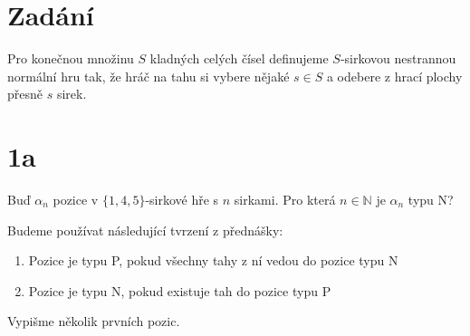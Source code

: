 \documentclass[../main.tex]{subfiles}
\begin{document}
\section*{Zadání}

Pro konečnou množinu $S$ kladných celých čísel definujeme $S$-sirkovou nestrannou 
normální hru tak, že hráč na tahu si vybere nějaké $s \in S$ a odebere z hrací plochy přesně $s$ sirek. 

\section*{1a}

Buď $\alpha_n$ pozice v $\{1,4,5\}$-sirkové hře s $n$ sirkami. Pro která $n\in \mathbb{N}$ je $\alpha_n$ typu N? 


Budeme používat následující tvrzení z přednášky: 
\begin{enumerate}
    \item Pozice je typu P, pokud všechny tahy z ní vedou do pozice typu N
    \item Pozice je typu N, pokud existuje tah do pozice typu P 
\end{enumerate}


Vypišme několik prvních pozic.
\end{document}
